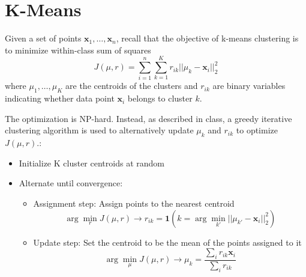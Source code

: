 \section{K-Means }

Given a set of points $\mathbf{x}_1, \dots, \mathbf{x}_n$, recall that the objective of k-means clustering is to minimize within-class sum of squares
\begin{equation*}
  \label{eq:kmeans-model}
	J(\mu,r) = \sum_{i=1}^n\sum_{k=1}^K r_{ik} ||\mu_k-\mathbf{x}_i||^2_2
  \end{equation*}
where $\mu_1,\ldots,\mu_K$ are the centroids of the clusters and $r_{ik}$ are binary variables indicating whether data point $\mathbf{x}_i$ belongs to cluster $k$. 

The optimization is NP-hard. Instead, as described in class, 
a greedy iterative clustering algorithm is used to alternatively update $\mu_k$ and $r_{ik}$ to optimize $J(\mu,r)$.:
\begin{itemize}
 \item Initialize K cluster centroids at random
 \item  Alternate until convergence:
\begin{itemize}
  \item  Assignment step: Assign points to the nearest centroid\\
\begin{equation*}
\arg \min_r J(\mu,r) \rightarrow r_{ik} = \textbf{1}(k = \arg \min_{k'} ||\mu_{k'} - \mathbf{x}_i||_2^2)
 \end{equation*}
 
  \item  Update step: Set the centroid to be the mean of the points assigned to it\\
  \begin{equation*}
 \arg \min_\mu J(\mu,r) \rightarrow \mu_k = \frac{\sum_i r_{ik} \mathbf{x}_i}{\sum_i r_{ik}}
  \end{equation*}
  \end{itemize}
\end{itemize}

